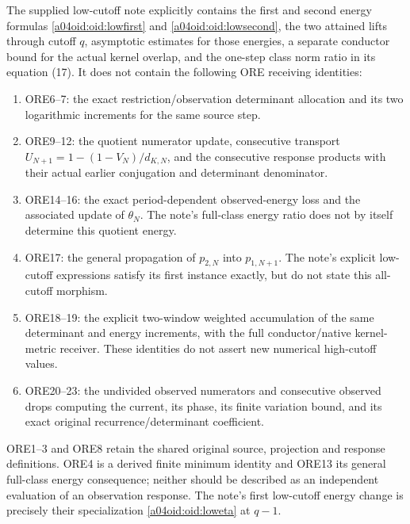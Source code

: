 The supplied low-cutoff note explicitly contains the first and second
energy formulas \eqref{a04oid:oid:lowfirst} and \eqref{a04oid:oid:lowsecond}, the
two attained lifts through cutoff $q$, asymptotic estimates for those
energies, a separate conductor bound for the actual kernel overlap,
and the one-step class norm ratio in its equation (17). It does not
contain the following ORE receiving identities:
\begin{enumerate}
\item ORE6--7: the exact restriction/observation determinant allocation
and its two logarithmic increments for the same source step.
\item ORE9--12: the quotient numerator update, consecutive transport
$U_{N+1}=1-(1-V_N)/d_{K,N}$, and the consecutive response products
with their actual earlier conjugation and determinant denominator.
\item ORE14--16: the exact period-dependent observed-energy loss and
the associated update of $\theta_N$. The note's full-class energy
ratio does not by itself determine this quotient energy.
\item ORE17: the general propagation of $p_{2,N}$ into $p_{1,N+1}$.
The note's explicit low-cutoff expressions satisfy its first instance
exactly, but do not state this all-cutoff morphism.
\item ORE18--19: the explicit two-window weighted accumulation of the
same determinant and energy increments, with the full conductor/native
kernel-metric receiver. These identities do not assert new numerical
high-cutoff values.
\item ORE20--23: the undivided observed numerators and consecutive
observed drops computing the current, its phase, its finite variation
bound, and its exact original recurrence/determinant coefficient.
\end{enumerate}
ORE1--3 and ORE8 retain the shared original source, projection and
response definitions. ORE4 is a derived finite minimum identity and
ORE13 its general full-class energy consequence; neither should be
described as an independent evaluation of an observation response.
The note's first low-cutoff energy change is precisely their
specialization \eqref{a04oid:oid:loweta} at $q-1$.

